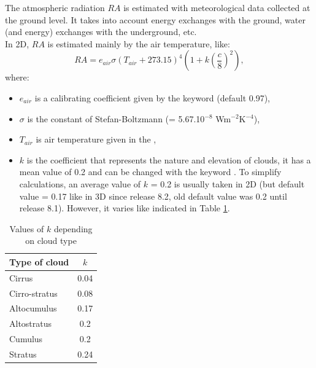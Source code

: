 The atmospheric radiation $RA$ is estimated with meteorological
data collected at the ground level.
It takes into account energy exchanges with the ground, water
(and energy) exchanges with the underground, etc.\\

In 2D, $RA$ is estimated mainly by the air temperature, like:
\begin{equation*}
RA=e_{air}\sigma\left(T_{air}+273.15 \right)^4\left(1+k\left(\frac{c}{8}\right)^2 \right),
\end{equation*}
where:
\begin{itemize}
\item $e_{air}$ is a calibrating coefficient given by the keyword
   (default 0.97),
\item $\sigma$ is the constant of Stefan-Boltzmann (= 5.67.10$^{-8}$ Wm$^{-2}$K$^{-4}$),
\item $T_{air}$ is air temperature given in the ,
\item $k$ is the coefficient that represents the nature and elevation of clouds,
it has a mean value of 0.2 and can be changed with the keyword
.
To simplify calculations, an average value of $k$ = 0.2 is usually taken in 2D
(but default value = 0.17 like in 3D since release 8.2,
old default value was 0.2 until release 8.1).
However, it varies like indicated in Table \ref{tab:kcloud}.
\end{itemize}

\begin{table}
  \centering
  \begin{tabular}{|l|c|}
     \hline
     Type of cloud & $k$ \\
     \hline \hline
     Cirrus & 0.04 \\
     Cirro-stratus & 0.08 \\
     Altocumulus & 0.17 \\
     Altostratus & 0.2 \\
     Cumulus & 0.2 \\
     Stratus & 0.24\\
     \hline
   \end{tabular}
  \caption{Values of $k$ depending on cloud type}\label{tab:kcloud}
\end{table}

